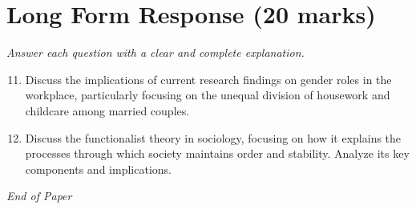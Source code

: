 \documentclass[12pt]{article}
\begin{document}
\section*{Long Form Response (20 marks)}
\textit{Answer each question with a clear and complete explanation.}
\begin{enumerate}[label=\arabic*.]
\setcounter{enumi}{10}
\item Discuss the implications of current research findings on gender roles in the workplace, particularly focusing on the unequal division of housework and childcare among married couples.
\item Discuss the functionalist theory in sociology, focusing on how it explains the processes through which society maintains order and stability. Analyze its key components and implications.
\end{enumerate}

\vfill
\noindent\textit{End of Paper}
\end{document}
